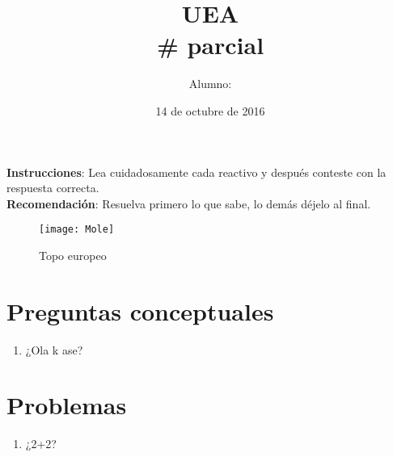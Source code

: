 \documentclass[10pt, twocolumn]{article}
\title{
   \textbf{UEA}\\ %
   \textcolor{Wolf}{\large \# parcial} %
}
\author{Alumno: \rule{0.41\textwidth}{0.4pt}}
\date{14 de octubre de 2016} %
\begin{document}
\maketitle %


\textbf{Instrucciones}: Lea cuidadosamente cada reactivo y después conteste con 
la respuesta correcta.\\
\textbf{Recomendación}: Resuelva primero lo que sabe, lo demás déjelo al final.
\begin{figure}[h!]
  \centering
  \texttt{[image: Mole]}
  \caption{Topo europeo}
  \label{fig:talpa}
\end{figure}

\section{Preguntas conceptuales}

\begin{enumerate}
  \item ¿Ola k ase?
\end{enumerate}

\section{Problemas}

\begin{enumerate}
  \item ¿2+2?
\end{enumerate}
\end{document}
